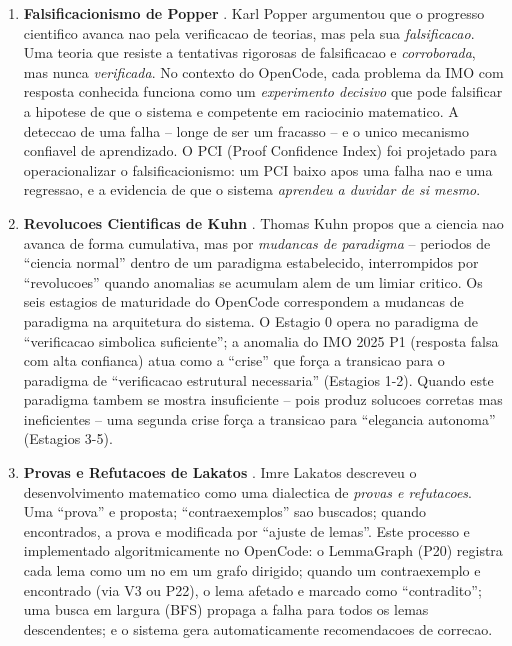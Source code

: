\documentclass[5p]{elsarticle}
\begin{document}
\begin{enumerate}[label=\textbf{Pilar \arabic*}:,leftmargin=*]

 \item \textbf{Falsificacionismo de Popper} \cite{popper1959}. Karl Popper
 argumentou que o progresso cientifico avanca nao pela verificacao de
 teorias, mas pela sua \textit{falsificacao}. Uma teoria que resiste a
 tentativas rigorosas de falsificacao e \textit{corroborada}, mas nunca
 \textit{verificada}. No contexto do OpenCode, cada problema da IMO com
 resposta conhecida funciona como um \textit{experimento decisivo} que pode
 falsificar a hipotese de que o sistema e competente em raciocinio
 matematico. A deteccao de uma falha -- longe de ser um fracasso -- e o
 unico mecanismo confiavel de aprendizado. O PCI (Proof Confidence Index)
 foi projetado para operacionalizar o falsificacionismo: um PCI baixo
 apos uma falha nao e uma regressao, e a evidencia de que o sistema
 \textit{aprendeu a duvidar de si mesmo}.

 \item \textbf{Revolucoes Cientificas de Kuhn} \cite{kuhn1962}. Thomas Kuhn
 propos que a ciencia nao avanca de forma cumulativa, mas por \textit{mudancas
 de paradigma} -- periodos de ``ciencia normal'' dentro de um paradigma
 estabelecido, interrompidos por ``revolucoes'' quando anomalias se acumulam
 alem de um limiar critico. Os seis estagios de maturidade do OpenCode
 correspondem a mudancas de paradigma na arquitetura do sistema. O Estagio 0
 opera no paradigma de ``verificacao simbolica suficiente''; a anomalia do
 IMO 2025 P1 (resposta falsa com alta confianca) atua como a ``crise'' que
 força a transicao para o paradigma de ``verificacao estrutural necessaria''
 (Estagios 1-2). Quando este paradigma tambem se mostra insuficiente -- pois
 produz solucoes corretas mas ineficientes -- uma segunda crise força a
 transicao para ``elegancia autonoma'' (Estagios 3-5).

 \item \textbf{Provas e Refutacoes de Lakatos} \cite{lakatos1976}. Imre Lakatos
 descreveu o desenvolvimento matematico como uma dialectica de \textit{provas
 e refutacoes}. Uma ``prova'' e proposta; ``contraexemplos'' sao buscados;
 quando encontrados, a prova e modificada por ``ajuste de lemas''. Este
 processo e implementado algoritmicamente no OpenCode: o LemmaGraph (P20)
 registra cada lema como um no em um grafo dirigido; quando um contraexemplo
 e encontrado (via V3 ou P22), o lema afetado e marcado como ``contradito'';
 uma busca em largura (BFS) propaga a falha para todos os lemas descendentes;
 e o sistema gera automaticamente recomendacoes de correcao.

\end{enumerate}
\end{document}
